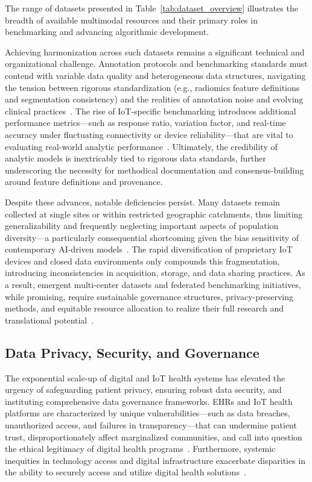 The range of datasets presented in Table~\ref{tab:dataset_overview} illustrates the breadth of available multimodal resources and their primary roles in benchmarking and advancing algorithmic development.

Achieving harmonization across such datasets remains a significant technical and organizational challenge. Annotation protocols and benchmarking standards must contend with variable data quality and heterogeneous data structures, navigating the tension between rigorous standardization (e.g., radiomics feature definitions and segmentation consistency) and the realities of annotation noise and evolving clinical practices~\cite{ref44,ref45,ref46,ref50,ref54,ref55,ref60,ref61,ref62,ref63,ref64,ref65,ref66,ref67,ref82,ref83,ref84,ref89,ref90,ref106}. The rise of IoT-specific benchmarking introduces additional performance metrics---such as response ratio, variation factor, and real-time accuracy under fluctuating connectivity or device reliability---that are vital to evaluating real-world analytic performance~\cite{ref84,ref106}. Ultimately, the credibility of analytic models is inextricably tied to rigorous data standards, further underscoring the necessity for methodical documentation and consensus-building around feature definitions and provenance.

Despite these advances, notable deficiencies persist. Many datasets remain collected at single sites or within restricted geographic catchments, thus limiting generalizability and frequently neglecting important aspects of population diversity---a particularly consequential shortcoming given the bias sensitivity of contemporary AI-driven models~\cite{ref43,ref75,ref106}. The rapid diversification of proprietary IoT devices and closed data environments only compounds this fragmentation, introducing inconsistencies in acquisition, storage, and data sharing practices. As a result, emergent multi-center datasets and federated benchmarking initiatives, while promising, require sustainable governance structures, privacy-preserving methods, and equitable resource allocation to realize their full research and translational potential~\cite{ref84,ref106}.

\subsection{Data Privacy, Security, and Governance}

The exponential scale-up of digital and IoT health systems has elevated the urgency of safeguarding patient privacy, ensuring robust data security, and instituting comprehensive data governance frameworks. EHRs and IoT health platforms are characterized by unique vulnerabilities—such as data breaches, unauthorized access, and failures in transparency—that can undermine patient trust, disproportionately affect marginalized communities, and call into question the ethical legitimacy of digital health programs~\cite{ref2,ref6,ref7,ref8,ref9,ref10,ref24,ref25,ref28,ref30,ref46,ref50,ref51,ref61,ref63,ref64,ref70,ref82,ref83,ref84,ref106}. Furthermore, systemic inequities in technology access and digital infrastructure exacerbate disparities in the ability to securely access and utilize digital health solutions~\cite{ref84,ref106}.

